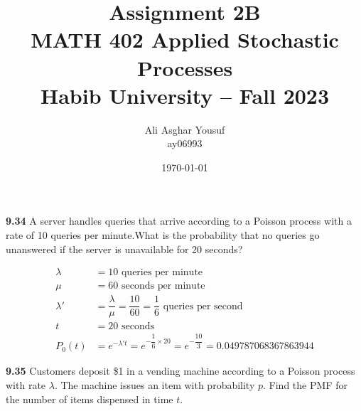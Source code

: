 \documentclass[answers]{exam}
\title{Assignment 2B\\ MATH 402 Applied Stochastic Processes\\ Habib University -- Fall 2023}
\author{Ali Asghar Yousuf \\ ay06993}  %
\date{\today}
\begin{document}
\maketitle

\begin{questions}
    \question \textbf{9.34} A server handles queries that arrive according to a Poisson process with a rate of 10 queries
    per minute.What is the probability that no queries go unanswered if the server is unavailable
    for 20 seconds?
    \begin{solution}
        \begin{align*}
            \lambda  & = 10 \text{ queries per minute}                                                             \\
            \mu      & = 60 \text{ seconds per minute}                                                             \\
            \lambda' & = \dfrac{\lambda}{\mu} = \dfrac{10}{60} = \dfrac{1}{6} \text{ queries per second}           \\
            t        & = 20 \text{ seconds}                                                                        \\
            P_0(t)   & = e^{-\lambda' t} = e^{-\dfrac{1}{6} \times 20} = e^{-\dfrac{10}{3}} = 0.049787068367863944
        \end{align*}
    \end{solution}

    \question \textbf{9.35} Customers deposit \$1 in a vending machine according to a Poisson process with rate $\lambda$.
    The machine issues an item with probability $p$. Find the PMF for the number of items dispensed in time $t$.


\end{questions}
\end{document}
